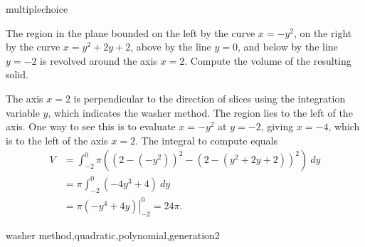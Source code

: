 \documentclass{ximera}
\begin{document}
\begin{question}[WasherQuad001]
\begin{type}
multiplechoice
\end{type}
The region in the plane bounded on the left by the curve \(x=-y^2\), on the right by the curve \(x=y^2+2y+2\), above by the line  \(y = 0\), and below by the line \(y = -2\) is revolved around the axis \(x = 2\). Compute the volume of the resulting solid.
\begin{multiplechoice}
\choice{\(16\pi\)}
\choice{\(20\pi\)}
\choice[correct]{\(24\pi\)}
\choice{\(28\pi\)}
\choice{\(32\pi\)}
\choice{\(36\pi\)}
\end{multiplechoice}
\begin{feedback}
The axis \(x = 2\) is perpendicular to the direction of slices using the integration variable \(y\), which indicates the washer method. 
 The region lies to the left of the axis. One way to see this is to evaluate \(x=-y^2\) at \(y = -2\), giving \(x = -4\), which is to the left of the axis \(x = 2\).
The integral to compute equals \[ \begin{aligned} V &= \int_{-2}^{0}\pi \left((2-(-y^2))^2 - (2-(y^2+2y+2))^2\right)~ dy\\
& = \pi \int_{-2}^{0} (-4y^3+4)~ dy\\
& = \pi \left. \left(-y^4+4y\right) \right|_{-2}^{0} = 24\pi. \end{aligned}\]
\end{feedback}
\begin{keywords}
washer method,quadratic,polynomial,generation2
\end{keywords}
\end{question}
\end{document}
